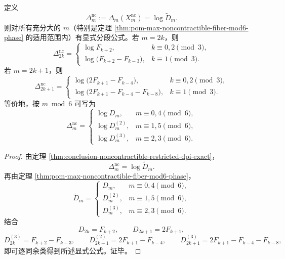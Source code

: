 \begin{theorem}\label{thm:conclusion-noncontractible-loss-mod6-explicit}
定义
\[
\Delta_m^{\mathrm{nc}}:=\Delta_m(X_m^{\mathrm{nc}})=\log \widetilde D_m.
\]
则对所有充分大的 \(m\)（特别是定理 \ref{thm:pom-max-noncontractible-fiber-mod6-phase} 的适用范围内）有显式分段公式。若 \(m=2k\)，则
\[
\Delta_{2k}^{\mathrm{nc}}
=
\begin{cases}
\log F_{k+2}, & k\equiv 0,2\pmod 3,\\[2mm]
\log\!\bigl(F_{k+2}-F_{k-3}\bigr), & k\equiv 1\pmod 3.
\end{cases}
\]
若 \(m=2k+1\)，则
\[
\Delta_{2k+1}^{\mathrm{nc}}
=
\begin{cases}
\log\!\bigl(2F_{k+1}-F_{k-4}\bigr), & k\equiv 0,2\pmod 3,\\[2mm]
\log\!\bigl(2F_{k+1}-F_{k-4}-F_{k-8}\bigr), & k\equiv 1\pmod 3.
\end{cases}
\]
等价地，按 \(m\bmod 6\) 可写为
\[
\Delta_m^{\mathrm{nc}}=
\begin{cases}
\log D_m, & m\equiv 0,4\pmod 6,\\
\log D_m^{(2)}, & m\equiv 1,5\pmod 6,\\
\log D_m^{(3)}, & m\equiv 2,3\pmod 6.
\end{cases}
\]
\end{theorem}
\begin{proof}
由定理 \ref{thm:conclusion-noncontractible-restricted-dpi-exact}，
\[
\Delta_m^{\mathrm{nc}}=\log \widetilde D_m.
\]
再由定理 \ref{thm:pom-max-noncontractible-fiber-mod6-phase}，
\[
\widetilde D_m=
\begin{cases}
D_m, & m\equiv 0,4\pmod 6,\\
D_m^{(2)}, & m\equiv 1,5\pmod 6,\\
D_m^{(3)}, & m\equiv 2,3\pmod 6.
\end{cases}
\]
结合
\[
D_{2k}=F_{k+2},\qquad D_{2k+1}=2F_{k+1},
\]
\[
D_{2k}^{(3)}=F_{k+2}-F_{k-3},\qquad D_{2k+1}^{(2)}=2F_{k+1}-F_{k-4},
\qquad
D_{2k+1}^{(3)}=2F_{k+1}-F_{k-4}-F_{k-8},
\]
即可逐同余类得到所述显式公式。证毕。
\end{proof}

